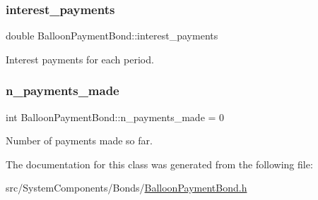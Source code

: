 \subsubsection{\texorpdfstring{interest\+\_\+payments}{interest\_payments}}
{\footnotesize\ttfamily double Balloon\+Payment\+Bond\+::interest\+\_\+payments\hspace{0.3cm}{\ttfamily [private]}}



Interest payments for each period. 

\mbox{\label{classBalloonPaymentBond_a82255e2f56110503d126fefbbc192d67}} 
\subsubsection{\texorpdfstring{n\+\_\+payments\+\_\+made}{n\_payments\_made}}
{\footnotesize\ttfamily int Balloon\+Payment\+Bond\+::n\+\_\+payments\+\_\+made = 0\hspace{0.3cm}{\ttfamily [private]}}



Number of payments made so far. 



The documentation for this class was generated from the following file\+:\begin{DoxyCompactItemize}
\item 
src/\+System\+Components/\+Bonds/\mbox{\hyperlink{BalloonPaymentBond_8h}{Balloon\+Payment\+Bond.\+h}}\end{DoxyCompactItemize}
